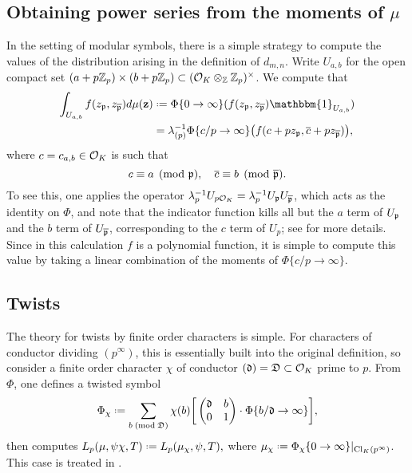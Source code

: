 \documentclass[a4paper,10pt]{article}
\numberwithin{equation}{section}
\begin{document}
\subsection{Obtaining power series from the moments of \texorpdfstring{$\mu$}{mu}}
In the setting of modular symbols, there is a simple strategy to compute the values of the distribution arising in the definition of $d_{m,n}$. Write $U_{a,b}$ for the open compact set $(a+p\mathbb{Z}_p)\times(b+p\mathbb{Z}_p) \subset (\mathcal{O}_K\otimes_{\mathbb{Z}}\mathbb{Z}_p)^\times$. We compute that
\begin{align*}
	\int_{U_{a,b}}f(z_{\pri},z_{\pribar}) d\mu(\mathbf{z}) &\defeq \Phi\{0\rightarrow\infty\}(f(z_{\pri},z_{\pribar})\mathbbm{1}_{U_{a,b}}) \\
    &= \lambda_{(p)}^{-1}\Phi\{c/p \rightarrow \infty\}\big(f(c + pz_{\pri}, \overline{c} + pz_{\pribar})\big),
    \end{align*}
where $c = c_{a,b} \in \mathcal{O}_K$ is such that
\[
	c \equiv a \pmod{\mathfrak{p}},\quad \overline{c}\equiv b\pmod{\overline{\mathfrak{p}}}.
\]
To see this, one applies the operator $\lambda_p^{-1}U_{p\mathcal{O}_K} = \lambda_p^{-1}U_{\mathfrak{p}}U_{\overline{\mathfrak{p}}}$, which acts as the identity on $\Phi$, and note that the indicator function kills all but the $a$ term of $U_{\mathfrak{p}}$ and the $b$ term of $U_{\overline{\mathfrak{p}}}$, corresponding to the $c$ term of $U_p$; see \cite[\S7.1]{Wil17} for more details. Since in this calculation $f$ is a polynomial function, it is simple to compute this value by taking a linear combination of the moments of $\Phi\{c/p\rightarrow \infty\}$.

\subsection{Twists}
The theory for twists by finite order characters is simple. For characters of conductor dividing $(p^\infty)$, this is essentially built into the original definition, so consider a finite order character $\chi$ of conductor $(\mathfrak{d}) = \mathfrak{D} \subset \mathcal{O}_K$ prime to $p$. From $\Phi$, one defines a twisted symbol
\[
	\Phi_\chi \defeq \sum_{b \newmod{\mathfrak{D}}} \chi(b) \bigg[\matrd{\mathfrak{d}}{b}{0}{1}\cdot\Phi\{b/\mathfrak{d} \rightarrow \infty\}\bigg],
\]
then computes $L_p(\mu,\psi\chi,T) \defeq L_p(\mu_\chi,\psi,T),$ where $\mu_\chi \defeq \Phi_\chi\{0\rightarrow \infty\}|_{\cl_K(p^\infty)}$. This case is treated in \cite[\S3.4]{BW17}.
\end{document}
